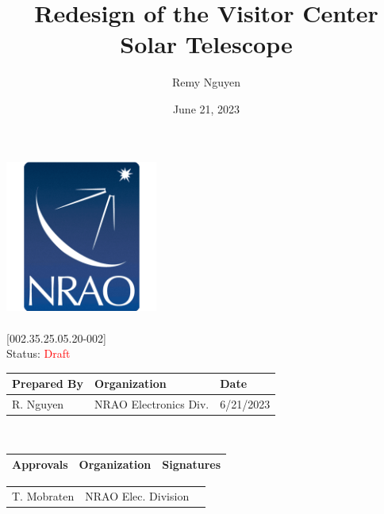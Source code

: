 \documentclass[titlepage]{article}
\title{Redesign of the Visitor Center Solar Telescope}
\author{Remy Nguyen
    }%
\date{June 21, 2023}
\def\docnum{[002.35.25.05.20-002]}
\def\status{\textcolor{red}{Draft}}
\renewcommand{\arraystretch}{1.4}
\begin{document}
\setlength{\leftmargin}{1in}        %
\setlength{\rightmargin}{1in}       %
\setlength{\voffset}{-1.2in}        %
\setlength{\headheight}{3.5cm}      %
\setlength{\textheight}{591pt}      %
\setlength{\footskip}{60pt}         %

\thispagestyle{fancy}
\begin{center}
     \includegraphics[width=5cm]{images/NRAO Logo Badge.png} \\
     \vspace*{0.5cm}
     \textbf{\Huge\thetitle} \\
     \vspace*{0.5cm}
     \large\docnum \\
     \huge Status: \status \\
     \vspace*{1cm} \large
     \begin{tabular}{|m{6.93cm}|m{4.5cm}|m{2cm}|} \hline
        \rowcolor{nraoblue}
        \textbf{Prepared By} & \textbf{Organization} & \textbf{Date} \\ \hline
        R. Nguyen & NRAO Electronics Div. & 6/21/2023 \\ 
        \hline
    \end{tabular} \\
    \vspace*{1cm}
    \begin{tabular}{|m{3cm}|m{3.5cm}|m{6.93cm}|} \hline
        \rowcolor{nraoblue}
        \textbf{Approvals} & \textbf{Organization} & \textbf{Signatures} \\ \hline
    \end{tabular}
    \renewcommand{\arraystretch}{1.5}
    \begin{tabular}{|m{3cm}|m{3.5cm}|m{6.93cm}|}
        T. Mobraten & NRAO Elec. Division &  \\ 

\end{tabular}
\end{center}
\end{document}

